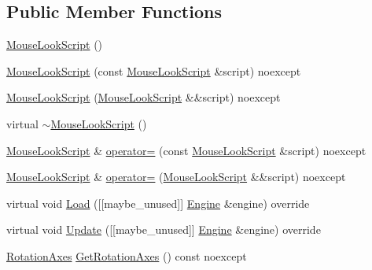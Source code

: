 \subsection*{Public Member Functions}
\begin{DoxyCompactItemize}
\item 
\mbox{\hyperlink{classmage_1_1script_1_1_mouse_look_script_a9055e93385160f4074cd2bc7fda3869e}{Mouse\+Look\+Script}} ()
\item 
\mbox{\hyperlink{classmage_1_1script_1_1_mouse_look_script_aa5237c229f27fa29f820bf6517209444}{Mouse\+Look\+Script}} (const \mbox{\hyperlink{classmage_1_1script_1_1_mouse_look_script}{Mouse\+Look\+Script}} \&script) noexcept
\item 
\mbox{\hyperlink{classmage_1_1script_1_1_mouse_look_script_ac21a383d6718ccc0d6c9faa5c5c1fe50}{Mouse\+Look\+Script}} (\mbox{\hyperlink{classmage_1_1script_1_1_mouse_look_script}{Mouse\+Look\+Script}} \&\&script) noexcept
\item 
virtual \mbox{\hyperlink{classmage_1_1script_1_1_mouse_look_script_a29a6d2cb4742fbf745822d015e72484f}{$\sim$\+Mouse\+Look\+Script}} ()
\item 
\mbox{\hyperlink{classmage_1_1script_1_1_mouse_look_script}{Mouse\+Look\+Script}} \& \mbox{\hyperlink{classmage_1_1script_1_1_mouse_look_script_a08731370926cbaee931170fd3fb108e6}{operator=}} (const \mbox{\hyperlink{classmage_1_1script_1_1_mouse_look_script}{Mouse\+Look\+Script}} \&script) noexcept
\item 
\mbox{\hyperlink{classmage_1_1script_1_1_mouse_look_script}{Mouse\+Look\+Script}} \& \mbox{\hyperlink{classmage_1_1script_1_1_mouse_look_script_aaff03f361a4e302c51e4210bb2e9ca8b}{operator=}} (\mbox{\hyperlink{classmage_1_1script_1_1_mouse_look_script}{Mouse\+Look\+Script}} \&\&script) noexcept
\item 
virtual void \mbox{\hyperlink{classmage_1_1script_1_1_mouse_look_script_a00c8dc8ebaf67da13bd0bc45de3ad8b6}{Load}} (\mbox{[}\mbox{[}maybe\+\_\+unused\mbox{]}\mbox{]} \mbox{\hyperlink{classmage_1_1_engine}{Engine}} \&engine) override
\item 
virtual void \mbox{\hyperlink{classmage_1_1script_1_1_mouse_look_script_a3b78aebd104b061f5d176843ef58a48a}{Update}} (\mbox{[}\mbox{[}maybe\+\_\+unused\mbox{]}\mbox{]} \mbox{\hyperlink{classmage_1_1_engine}{Engine}} \&engine) override
\item 
\mbox{\hyperlink{classmage_1_1script_1_1_mouse_look_script_a662018db64c5dc84a958eb1c6123a829}{Rotation\+Axes}} \mbox{\hyperlink{classmage_1_1script_1_1_mouse_look_script_a612d8c23cc3f0711a07b32304082dfb5}{Get\+Rotation\+Axes}} () const noexcept

\end{DoxyCompactItemize}
